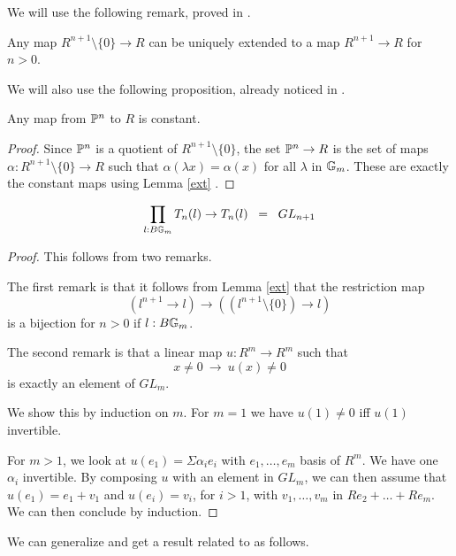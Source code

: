 We will use the following remark, proved in \cite{draft}.

\begin{lemma}\label{ext}
  Any map $R^{n+1}\setminus\{0\}\rightarrow R$ can be uniquely extended to a map $R^{n+1}\rightarrow R$ for $n>0$.
\end{lemma}

We will also use the following proposition, already noticed in \cite{draft}.

\begin{proposition}\label{const}
 Any map from $\mathbb{P}^n$ to $R$ is constant.
\end{proposition}

\begin{proof}
  Since $\mathbb{P}^n$ is a quotient of $R^{n+1}\setminus\{0\}$, the set $\mathbb{P}^n\rightarrow R$ is
  the set of maps $\alpha:R^{n+1}\setminus\{0\}\rightarrow R$
  such that $\alpha(\lambda x) = \alpha(x)$ for all $\lambda$ in $\mathbb{G}_m$. These are exactly the constant maps
  using Lemma \ref{ext} \cite{draft}.
\end{proof}

\begin{proposition}\label{aut}
$$\prod_{l:B\mathbb{G}_m}T_n(l)\rightarrow T_n(l) \;\;=\;\; GL_{n+1}$$
\end{proposition}

\begin{proof}
  This follows from two remarks.

  The first remark is that it follows from Lemma \ref{ext} that the restriction map
$$
(l^{n+1}\rightarrow l)\rightarrow ((l^{n+1}\setminus\{0\})\rightarrow l)
$$
is a bijection for $n>0$ if $l:B\mathbb{G}_m$.

\medskip

The second remark is that a linear map $u:R^{m}\rightarrow R^{m}$ such that
$$
x\neq 0~\rightarrow~u(x)\neq 0
$$
is exactly an element of $GL_{m}$.

We show this by induction on $m$. For $m=1$ we have $u(1)\neq 0$ iff $u(1)$ invertible.

For $m>1$, we look at $u(e_1) = \Sigma \alpha_ie_i$ with $e_1,\dots,e_m$ basis of $R^m$.
We have one $\alpha_i$ invertible. By composing $u$ with an element in $GL_m$, we can then
assume that $u(e_1) = e_1+v_1$ and $u(e_i) = v_i$, for $i>1$, with $v_1,\dots,v_m$ in $Re_2+\dots+Re_m$.
We can then conclude by induction.
\end{proof}

We can generalize 
and get a result related to  as follows.
 
